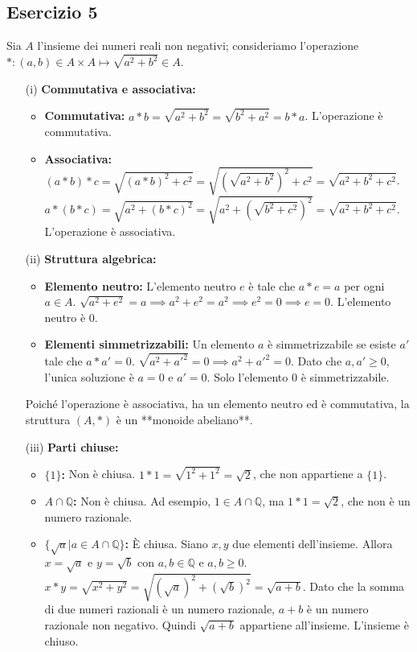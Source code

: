 \subsection*{Esercizio 5}
Sia $A$ l'insieme dei numeri reali non negativi; consideriamo l'operazione $*:(a,b)\in A\times A\mapsto\sqrt{a^{2}+b^{2}}\in A$.
\begin{itemize}
    \item[(i)] \textbf{Commutativa e associativa:}
    \begin{itemize}
        \item \textbf{Commutativa:} $a*b = \sqrt{a^2+b^2} = \sqrt{b^2+a^2} = b*a$. L'operazione è commutativa.
        \item \textbf{Associativa:} $(a*b)*c = \sqrt{(a*b)^2+c^2} = \sqrt{(\sqrt{a^2+b^2})^2+c^2} = \sqrt{a^2+b^2+c^2}$.
        $a*(b*c) = \sqrt{a^2+(b*c)^2} = \sqrt{a^2+(\sqrt{b^2+c^2})^2} = \sqrt{a^2+b^2+c^2}$.
        L'operazione è associativa.
    \end{itemize}
    \item[(ii)] \textbf{Struttura algebrica:}
    \begin{itemize}
        \item \textbf{Elemento neutro:} L'elemento neutro $e$ è tale che $a*e = a$ per ogni $a\in A$.
        $\sqrt{a^2+e^2}=a \implies a^2+e^2=a^2 \implies e^2=0 \implies e=0$. L'elemento neutro è $0$.
        \item \textbf{Elementi simmetrizzabili:} Un elemento $a$ è simmetrizzabile se esiste $a'$ tale che $a*a'=0$.
        $\sqrt{a^2+a'^2}=0 \implies a^2+a'^2=0$. Dato che $a,a' \ge 0$, l'unica soluzione è $a=0$ e $a'=0$.
        Solo l'elemento $0$ è simmetrizzabile.
    \end{itemize}
    Poiché l'operazione è associativa, ha un elemento neutro ed è commutativa, la struttura $(A, *)$ è un **monoide abeliano**.

    \item[(iii)] \textbf{Parti chiuse:}
    \begin{itemize}
        \item \textbf{$\{1\}$:} Non è chiusa. $1*1 = \sqrt{1^2+1^2} = \sqrt{2}$, che non appartiene a $\{1\}$.
        \item \textbf{$A\cap\mathbb{Q}$:} Non è chiusa. Ad esempio, $1\in A\cap\mathbb{Q}$, ma $1*1=\sqrt{2}$, che non è un numero razionale.
        \item \textbf{$\{\sqrt{a}|a\in A\cap\mathbb{Q}\}$:} È chiusa. Siano $x,y$ due elementi dell'insieme. Allora $x=\sqrt{a}$ e $y=\sqrt{b}$ con $a,b\in\mathbb{Q}$ e $a,b\ge 0$.
        $x*y=\sqrt{x^2+y^2}=\sqrt{(\sqrt{a})^2+(\sqrt{b})^2}=\sqrt{a+b}$.
        Dato che la somma di due numeri razionali è un numero razionale, $a+b$ è un numero razionale non negativo. Quindi $\sqrt{a+b}$ appartiene all'insieme. L'insieme è chiuso.
    \end{itemize}
\end{itemize}